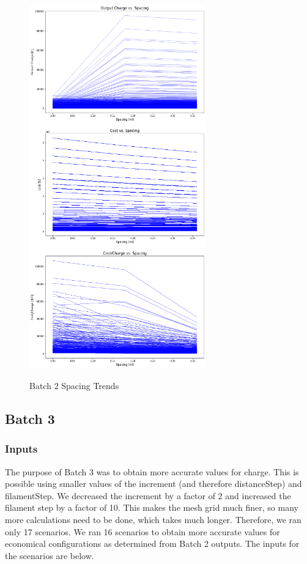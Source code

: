 \begin{figure}
    \begin{center}
    \includegraphics[width=3in]{fig29.png}
    \end{center}
    \renewcommand{\baselinestretch}{1}
    \small\normalsize
    \begin{quote}
    \caption[Batch 2 Spacing Trends]{Batch 2 Spacing Trends} \label{fig: f29}
    \end{quote}
\end{figure}

\subsection{Batch 3}
\label{sec: s4.1.3}
\subsubsection{Inputs}
The purpose of Batch 3 was to obtain more accurate values for charge. This is possible using smaller values of 
the increment (and therefore distanceStep) and filamentStep. We decreased the increment by a factor of 2 and 
increased the filament step by a factor of 10. This makes the mesh grid much finer, so many more calculations 
need to be done, which takes much longer. Therefore, we ran only 17 scenarios. We ran 16 scenarios to obtain 
more accurate values for economical configurations as determined from Batch 2 outputs. The inputs for the 
scenarios are below. 

